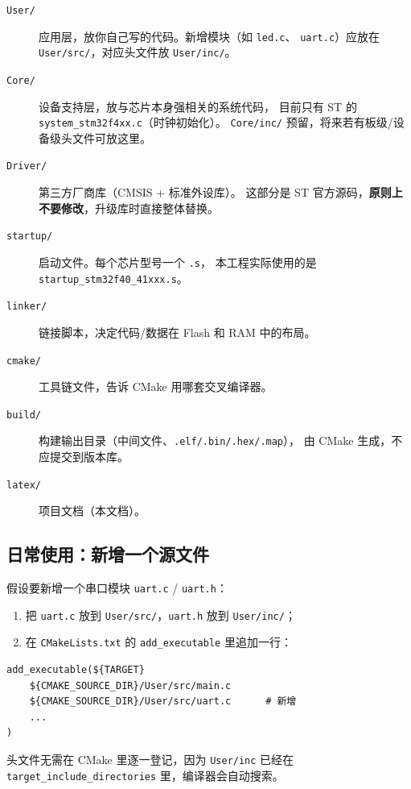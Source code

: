 \begin{description}
  \item[\texttt{User/}] 应用层，放你自己写的代码。新增模块（如 \texttt{led.c}、
        \texttt{uart.c}）应放在 \texttt{User/src/}，对应头文件放 \texttt{User/inc/}。
  \item[\texttt{Core/}] 设备支持层，放与芯片本身强相关的系统代码，
        目前只有 ST 的 \texttt{system\_stm32f4xx.c}（时钟初始化）。
        \texttt{Core/inc/} 预留，将来若有板级/设备级头文件可放这里。
  \item[\texttt{Driver/}] 第三方厂商库（CMSIS + 标准外设库）。
        这部分是 ST 官方源码，\textbf{原则上不要修改}，升级库时直接整体替换。
  \item[\texttt{startup/}] 启动文件。每个芯片型号一个 \texttt{.s}，
        本工程实际使用的是 \texttt{startup\_stm32f40\_41xxx.s}。
  \item[\texttt{linker/}] 链接脚本，决定代码/数据在 Flash 和 RAM 中的布局。
  \item[\texttt{cmake/}] 工具链文件，告诉 CMake 用哪套交叉编译器。
  \item[\texttt{build/}] 构建输出目录（中间文件、\texttt{.elf/.bin/.hex/.map}），
        由 CMake 生成，不应提交到版本库。
  \item[\texttt{latex/}] 项目文档（本文档）。
\end{description}

\subsection{日常使用：新增一个源文件}

假设要新增一个串口模块 \texttt{uart.c} / \texttt{uart.h}：

\begin{enumerate}
  \item 把 \texttt{uart.c} 放到 \texttt{User/src/}，\texttt{uart.h} 放到 \texttt{User/inc/}；
  \item 在 \texttt{CMakeLists.txt} 的 \texttt{add\_executable} 里追加一行：
\end{enumerate}

\begin{lstlisting}[style=generic]
add_executable(${TARGET}
    ${CMAKE_SOURCE_DIR}/User/src/main.c
    ${CMAKE_SOURCE_DIR}/User/src/uart.c      # 新增
    ...
)
\end{lstlisting}

头文件无需在 CMake 里逐一登记，因为 \texttt{User/inc} 已经在
\texttt{target\_include\_directories} 里，编译器会自动搜索。
